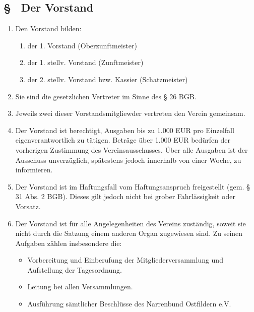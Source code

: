 \subsection{§ \thesaparagraphcounter\ Der Vorstand} \label{sa:par:vorstand}
\begin{enumerate}
    \item \label{sa:abs:gwyzvm} Den Vorstand bilden:
    \begin{enumerate}
        \item der 1. Vorstand (Oberzunftmeister)
        \item der 1. stellv. Vorstand (Zunftmeister)
        \item der 2. stellv. Vorstand bzw. Kassier (Schatzmeister)
    \end{enumerate}
    
    \item \label{sa:abs:5csjdg} Sie sind die gesetzlichen Vertreter im Sinne des § 26 BGB.

    \item \label{sa:abs:tnizm5} Jeweils zwei dieser Vorstandsmitgliewder vertreten den Verein gemeinsam.

    \item \label{sa:abs:ibtszq} Der Vorstand ist berechtigt, Ausgaben bis zu 1.000 EUR pro Einzelfall eigenverantwortlich zu tätigen. Beträge über 1.000 EUR bedürfen der vorherigen Zustimmung des Vereinsausschusses. Über alle Ausgaben ist der Ausschuss unverzüglich, spätestens jedoch innerhalb von einer Woche, zu informieren.

    \item \label{sa:abs:6z1wlp} Der Vorstand ist  im Haftungsfall vom Haftungsanspruch freigestellt (gem. § 31 Abs. 2 BGB). Dieses gilt jedoch nicht bei grober Fahrlässigkeit oder Vorsatz.

    \item \label{sa:abs:vln3it} Der Vorstand ist für alle Angelegenheiten des Vereins zuständig, soweit sie nicht durch die Satzung einem anderen Organ zugewiesen sind. Zu seinen Aufgaben zählen insbesondere die:
    \begin{itemize}
        \item Vorbereitung und Einberufung der Mitgliederversammlung und Aufstellung der Tagesordnung.
        
        \item Leitung bei allen Versammlungen.

        \item Ausführung sämtlicher Beschlüsse des Narrenbund Ostfildern e.V.


\end{itemize}
\end{enumerate}
